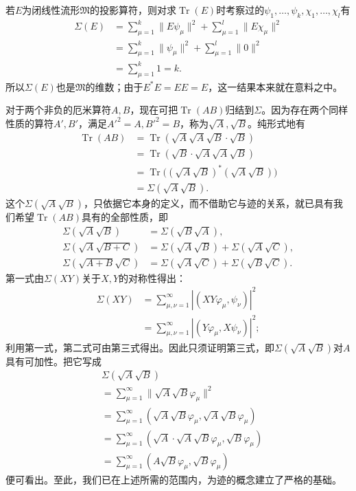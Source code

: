 \documentclass[fontsize=13pt,twoside,openany,headings=normal,parskip=false,bookmarkpackage=false,DIV=calc]{scrbook}
\begin{document}
若$E$为闭线性流形$\mathfrak M$的投影算符，则对求$\operatorname{Tr}(E)$时考察过的$\psi_1,\allowbreak \ldots,\allowbreak \psi_k,\allowbreak \chi_1,\allowbreak \ldots,\allowbreak \chi_l$有\hypertarget{origpage-97}{}\label{origpage-97}\begin{align*}
\Sigma(E)&=\sum_{\mu=1}^{k}\|E\psi_\mu\|^2
+\sum_{\mu=1}^{l}\|E\chi_\mu\|^2\\
&=\sum_{\mu=1}^{k}\|\psi_\mu\|^2
+\sum_{\mu=1}^{l}\|0\|^2\\
&=\sum_{\mu=1}^{k}1=k.
\end{align*}
所以$\Sigma(E)$也是$\mathfrak M$的维数；由于$E^*E=EE=E$，这一结果本来就在意料之中。

对于两个非负的厄米算符$A,\allowbreak B$，现在可把$\operatorname{Tr}(AB)$归结到$\Sigma$。因为存在两个同样性质的算符$A',\allowbreak B'$，满足$A'^2=A,\allowbreak B'^2=B$，称为$\sqrt A,\allowbreak \sqrt B$。纯形式地有
\begin{align*}
\operatorname{Tr}(AB)
&=\operatorname{Tr}(\sqrt A\sqrt A\sqrt B\cdot\sqrt B)\\
&=\operatorname{Tr}(\sqrt B\cdot\sqrt A\sqrt A\sqrt B)\\
&=\operatorname{Tr}\bigl((\sqrt A\sqrt B)^*(\sqrt A\sqrt B)\bigr)\\
&=\Sigma(\sqrt A\sqrt B).
\end{align*}
这个$\Sigma(\sqrt A\sqrt B)$，只依据它本身的定义，而不借助它与迹的关系，就已具有我们希望$\operatorname{Tr}(AB)$具有的全部性质，即
\begin{align*}
\Sigma(\sqrt A\sqrt B)&=\Sigma(\sqrt B\sqrt A),\\
\Sigma(\sqrt A\sqrt{B+C})&=\Sigma(\sqrt A\sqrt B)+\Sigma(\sqrt A\sqrt C),\\
\Sigma(\sqrt{A+B}\sqrt C)&=\Sigma(\sqrt A\sqrt C)+\Sigma(\sqrt B\sqrt C).
\end{align*}
第一式由$\Sigma(XY)$关于$X,\allowbreak Y$的对称性得出：
\begin{align*}
\Sigma(XY)&=\sum_{\mu,\nu=1}^{\infty}|(XY\varphi_\mu,\psi_\nu)|^2\\
&=\sum_{\mu,\nu=1}^{\infty}|(Y\varphi_\mu,X\psi_\nu)|^2;
\end{align*}
利用第一式，第二式可由第三式得出。因此只须证明第三式，即$\Sigma(\sqrt A\sqrt B)$对$A$具有可加性。把它写成
\begin{align*}
&\Sigma(\sqrt A\sqrt B)\\
&=\sum_{\mu=1}^{\infty}\|\sqrt A\sqrt B\varphi_\mu\|^2\\
&=\sum_{\mu=1}^{\infty}(\sqrt A\sqrt B\varphi_\mu,\sqrt A\sqrt B\varphi_\mu)\\
&=\sum_{\mu=1}^{\infty}(\sqrt A\cdot\sqrt A\sqrt B\varphi_\mu,\sqrt B\varphi_\mu)\\
&=\sum_{\mu=1}^{\infty}(A\sqrt B\varphi_\mu,\sqrt B\varphi_\mu)
\end{align*}
便可看出。至此，我们已在上述所需的范围内，为迹的概念建立了严格的基础。
\end{document}

